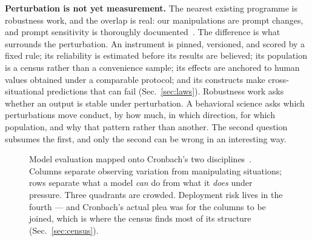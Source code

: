 \documentclass[journal]{IEEEtran}
\begin{document}
\textbf{Perturbation is not yet measurement.} The nearest existing
programme is robustness work, and the overlap is real: our
manipulations are prompt changes, and prompt sensitivity is
thoroughly documented~\cite{sclar2024quantifying}. The difference is
what surrounds the perturbation. An instrument is pinned, versioned,
and scored by a fixed rule; its reliability is estimated before its
results are believed; its population is a census rather than a
convenience sample; its effects are anchored to human values obtained
under a comparable protocol; and its constructs make
cross-situational predictions that can fail
(Sec.~\ref{sec:laws}). Robustness work asks whether an output is
stable under perturbation. A behavioral science asks which
perturbations move conduct, by how much, in which direction, for
which population, and why that pattern rather than another. The
second question subsumes the first, and only the second can be wrong
in an interesting way.

\begin{figure}[t]
\centering
{}
\caption{Model evaluation mapped onto Cronbach's two
disciplines~\cite{cronbach1957two}. Columns separate observing
variation from manipulating situations; rows separate what a model
\emph{can} do from what it \emph{does} under pressure. Three
quadrants are crowded. Deployment risk lives in the fourth --- and
Cronbach's actual plea was for the columns to be joined, which is
where the census finds most of its structure
(Sec.~\ref{sec:census}).}
\label{fig:quadrants}
\end{figure}
\end{document}
